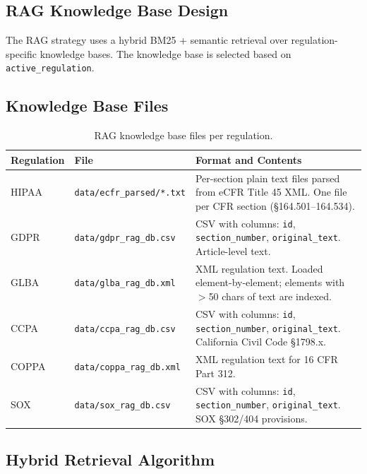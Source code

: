 \documentclass[11pt,letterpaper]{article}
\begin{document}
\begin{appendices}
\section{RAG Knowledge Base Design}
\label{sec:rag-kb}

The RAG strategy uses a hybrid BM25 + semantic retrieval over regulation-specific knowledge bases. The knowledge base is selected based on \texttt{active\_regulation}.

\subsection{Knowledge Base Files}

\begin{table}[H]
\centering
\begin{tabularx}{\textwidth}{llX}
\toprule
\textbf{Regulation} & \textbf{File} & \textbf{Format and Contents} \\
\midrule
HIPAA & \texttt{data/ecfr\_parsed/*.txt} & Per-section plain text files parsed from eCFR Title 45 XML. One file per CFR section (\S 164.501--164.534). \\
GDPR & \texttt{data/gdpr\_rag\_db.csv} & CSV with columns: \texttt{id}, \texttt{section\_number}, \texttt{original\_text}. Article-level text. \\
GLBA & \texttt{data/glba\_rag\_db.xml} & XML regulation text. Loaded element-by-element; elements with $>$50 chars of text are indexed. \\
CCPA & \texttt{data/ccpa\_rag\_db.csv} & CSV with columns: \texttt{id}, \texttt{section\_number}, \texttt{original\_text}. California Civil Code \S 1798.x. \\
COPPA & \texttt{data/coppa\_rag\_db.xml} & XML regulation text for 16 CFR Part 312. \\
SOX & \texttt{data/sox\_rag\_db.csv} & CSV with columns: \texttt{id}, \texttt{section\_number}, \texttt{original\_text}. SOX \S 302/404 provisions. \\
\bottomrule
\end{tabularx}
\caption{RAG knowledge base files per regulation.}
\end{table}

\subsection{Hybrid Retrieval Algorithm}


\end{appendices}
\end{document}
